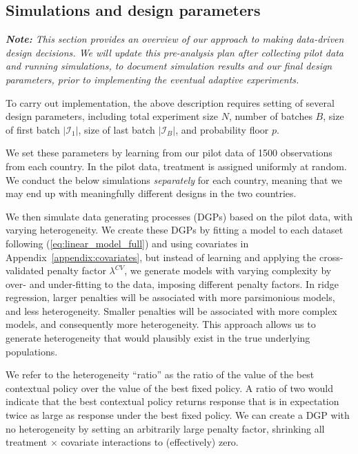\documentclass[letterpaper, 12pt, parskip=full,]{scrartcl}
\begin{document}
\subsection{Simulations and design parameters}\label{simulations}

\textit{\textbf{Note:} This section provides an overview of our approach to making data-driven design decisions. We will update this pre-analysis plan \textit{after} collecting pilot data and running simulations, to document simulation results and our final design parameters, prior to implementing the eventual adaptive experiments. }

To carry out implementation, the above description requires setting of several design parameters, including total experiment size $N$, number of batches $B$,  size of first batch $|\mathcal{I}_1|$, size of last batch $|\mathcal{I}_B|$, and probability floor $p$. 

We set these parameters by learning from our pilot data of 1500 observations from each country. In the pilot data, treatment is assigned uniformly at random. We conduct the below simulations \textit{separately} for each country, meaning that we may end up with meaningfully different designs in the two countries. 

We then simulate data generating processes (DGPs) based on the pilot data, with varying heterogeneity. We create these DGPs by fitting a model to each dataset following (\ref{eq:linear_model_full}) and using covariates in Appendix~\ref{appendix:covariates}, but instead of learning and applying the cross-validated penalty factor $\lambda^{CV}$, we generate models with varying complexity by over- and under-fitting to the data, imposing different penalty factors. In ridge regression, larger penalties will be associated with more parsimonious models, and less heterogeneity. Smaller penalties will be associated with more complex models, and consequently more heterogeneity. This approach allows us to generate heterogeneity that would plausibly exist in the true underlying populations. 

We refer to the heterogeneity ``ratio'' as the ratio of the value of the best contextual policy over the value of the best fixed policy. A ratio of two would indicate that the best contextual policy returns response that is in expectation twice as large as response under the best fixed policy. We can create a DGP with no heterogeneity by setting an arbitrarily large penalty factor, shrinking all treatment $\times$ covariate interactions to (effectively) zero. 
\end{document}
